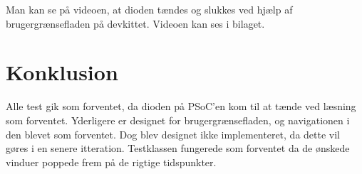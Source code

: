 Man kan se på videoen, at dioden tændes og slukkes ved hjælp af brugergrænsefladen på devkittet. Videoen kan ses i bilaget.

\section*{Konklusion}

Alle test gik som forventet, da dioden på PSoC'en kom til at tænde ved læsning som forventet. Yderligere er designet for brugergrænsefladen, og navigationen i den blevet som forventet. Dog blev designet ikke implementeret, da dette vil gøres i en senere itteration. Testklassen fungerede som forventet da de ønskede vinduer poppede frem på de rigtige tidspunkter.